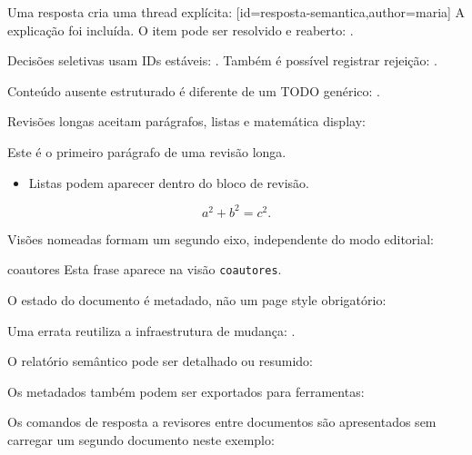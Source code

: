 \documentclass[11pt]{article}
\begin{document}
Uma resposta cria uma thread explícita:
[id=resposta-semantica,author=maria]
        {A explicação foi incluída.}
O item pode ser resolvido e reaberto:
.

Decisões seletivas usam IDs estáveis:
.
Também é possível registrar rejeição:
.

Conteúdo ausente estruturado é diferente de um TODO genérico:
.

Revisões longas aceitam parágrafos, listas e matemática display:

\begin{cwrevision}[id=revisao-longa,author=maria]
Este é o primeiro parágrafo de uma revisão longa.

\begin{itemize}
\item Listas podem aparecer dentro do bloco de revisão.
\end{itemize}

\[
  a^2+b^2=c^2 .
\]
\end{cwrevision}

Visões nomeadas formam um segundo eixo, independente do modo editorial:

\begin{cwview}{coautores}
Esta frase aparece na visão \texttt{coautores}.
\end{cwview}

O estado do documento é metadado, não um page style obrigatório:

\cwshowdocumentstatus

Uma errata reutiliza a infraestrutura de mudança:
.

O relatório semântico pode ser detalhado ou resumido:
\cwreport[mode=summary]

Os metadados também podem ser exportados para ferramentas:

Os comandos de resposta a revisores entre documentos são apresentados sem
carregar um segundo documento neste exemplo:
\end{document}
